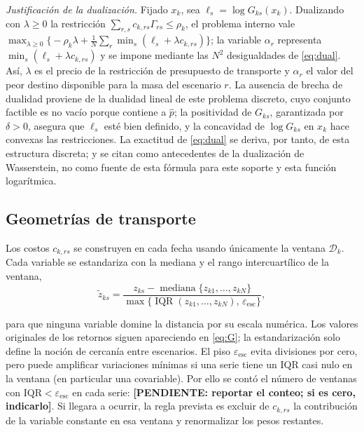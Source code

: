 \emph{Justificación de la dualización.} Fijado $x_k$, sea $\ell_s=\log G_{ks}(x_k)$. Dualizando con $\lambda\ge0$ la restricción $\sum_{r,s}c_{k,rs}\Gamma_{rs}\le\rho_k$, el problema interno vale $\max_{\lambda\ge0}\bigl\{-\rho_k\lambda+\tfrac1N\sum_{r}\min_{s}(\ell_s+\lambda c_{k,rs})\bigr\}$; la variable $\alpha_r$ representa $\min_s(\ell_s+\lambda c_{k,rs})$ y se impone mediante las $N^2$ desigualdades de \eqref{eq:dual}. Así, $\lambda$ es el precio de la restricción de presupuesto de transporte y $\alpha_r$ el valor del peor destino disponible para la masa del escenario $r$. La ausencia de brecha de dualidad proviene de la dualidad lineal de este problema discreto, cuyo conjunto factible es no vacío porque contiene a $\hat p$; la positividad de $G_{ks}$, garantizada por $\delta>0$, asegura que $\ell_s$ esté bien definido, y la concavidad de $\log G_{ks}$ en $x_k$ hace convexas las restricciones. La exactitud de \eqref{eq:dual} se deriva, por tanto, de esta estructura discreta; \citet{mohajerin2018} y \citet{kuhn2019} se citan como antecedentes de la dualización de Wasserstein, no como fuente de esta fórmula para este soporte y esta función logarítmica.


\subsection{Geometrías de transporte}\label{sec:geom}

Los costos $c_{k,rs}$ se construyen en cada fecha usando únicamente la ventana $\mathcal D_k$. Cada variable se estandariza con la mediana y el rango intercuartílico de la ventana,
\begin{equation}\label{eq:std}
\tilde z_{ks}=\frac{z_{ks}-\operatorname{mediana}\{z_{k1},\dots,z_{kN}\}}{\max\{\operatorname{IQR}(z_{k1},\dots,z_{kN}),\,\varepsilon_{\mathrm{esc}}\}},
\end{equation}

para que ninguna variable domine la distancia por su escala numérica. Los valores originales de los retornos siguen apareciendo en \eqref{eq:G}; la estandarización solo define la noción de cercanía entre escenarios. El piso $\varepsilon_{\mathrm{esc}}$ evita divisiones por cero, pero puede amplificar variaciones mínimas si una serie tiene un IQR casi nulo en la ventana (en particular una covariable). Por ello se contó el número de ventanas con $\mathrm{IQR}<\varepsilon_{\mathrm{esc}}$ en cada serie: \textbf{[PENDIENTE: reportar el conteo; si es cero, indicarlo]}. Si llegara a ocurrir, la regla prevista es excluir de $c_{k,rs}$ la contribución de la variable constante en esa ventana y renormalizar los pesos restantes.


